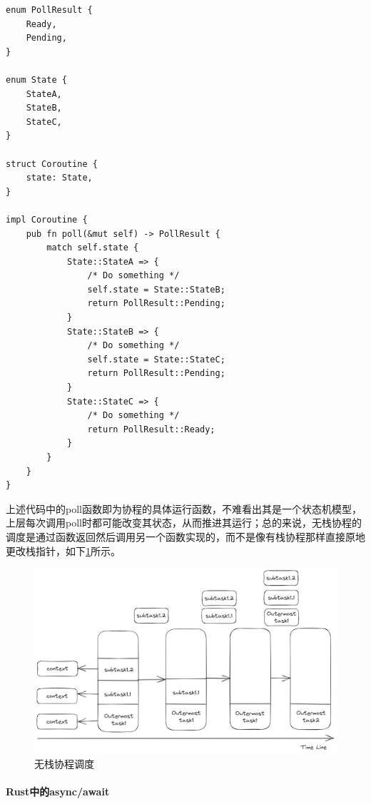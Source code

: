 \begin{tcolorbox}[
title=\textbf{coroutine example},
listing only,
breakable
]
    \begin{verbatim}
enum PollResult {
    Ready,
    Pending,
}

enum State {
    StateA,
    StateB,
    StateC,
}

struct Coroutine {
    state: State,
}

impl Coroutine {
    pub fn poll(&mut self) -> PollResult {
        match self.state {
            State::StateA => {
                /* Do something */
                self.state = State::StateB;
                return PollResult::Pending;
            }
            State::StateB => {
                /* Do something */
                self.state = State::StateC;
                return PollResult::Pending;
            }
            State::StateC => {
                /* Do something */
                return PollResult::Ready;
            }
        }
    }
}
    \end{verbatim}
\end{tcolorbox}

上述代码中的poll函数即为协程的具体运行函数，不难看出其是一个状态机模型，上层每次调用poll时都可能改变其状态，从而推进其运行；总的来说，无栈协程的调度是通过函数返回然后调用另一个函数实现的，而不是像有栈协程那样直接原地更改栈指针，如下\cref{pic:nonstack_coroutine}所示。
\begin{figure}[hbt]
    \centering
    \includegraphics[width=.9\linewidth]{figure/nonstack_coroutine.png}
    \caption{无栈协程调度}
    \label{pic:nonstack_coroutine}
\end{figure}

\paragraph{Rust中的async/await}~{}

